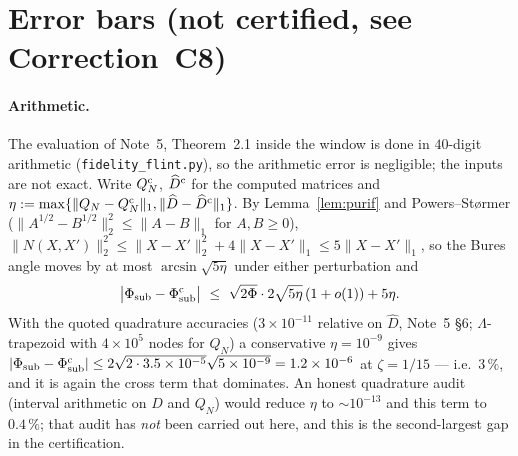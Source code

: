 \documentclass[11pt]{article}
\begin{document}
\section{Error bars (not certified, see Correction~C8)}\label{sec:bars}

\paragraph{Arithmetic.}  The evaluation of Note~5, Theorem~2.1 inside the window is done in
$40$-digit arithmetic (\texttt{fidelity\_flint.py}), so the arithmetic error is negligible; the
inputs are not exact.  Write $Q_N^{\rm c}$, $\widehat D^{\rm c}$ for the computed matrices and
$\eta:=\max\{\|Q_N-Q_N^{\rm c}\|_1,\|\widehat D-\widehat D^{\rm c}\|_1\}$.  By Lemma~\ref{lem:purif}
and Powers--St\o rmer ($\|A^{1/2}-B^{1/2}\|_2^2\le\|A-B\|_1$ for $A,B\ge0$),
$\|N(X,X')\|_2^2\le\|X-X'\|_2^2+4\|X-X'\|_1\le5\|X-X'\|_1$, so the Bures angle moves by at most
$\arcsin\sqrt{5\eta}$ under either perturbation and
\begin{equation}\label{eq:arith}
 \bigl|\Phi_{\rm sub}-\Phi_{\rm sub}^{\rm c}\bigr|
 \ \le\ \sqrt{2\Phi}\cdot2\sqrt{5\eta}\,(1+o(1))+5\eta .
\end{equation}
With the quoted quadrature accuracies ($3\times10^{-11}$ relative on $\widehat D$, Note~5 \S6;
$\Lambda$-trapezoid with $4\times10^5$ nodes for $Q_N$) a conservative $\eta=10^{-9}$ gives
$|\Phi_{\rm sub}-\Phi^{\rm c}_{\rm sub}|\le2\sqrt{2\cdot3.5\times10^{-5}}\sqrt{5\times10^{-9}}
=1.2\times10^{-6}$ at $\zeta=1/15$ --- i.e.\ $3\,\%$, and it is again the cross term that dominates.
An honest quadrature audit (interval arithmetic on $\widehat D$ and $Q_N$) would reduce $\eta$ to
$\sim10^{-13}$ and this term to $0.4\,\%$; that audit has \emph{not} been carried out here, and this
is the second-largest gap in the certification.
\end{document}
